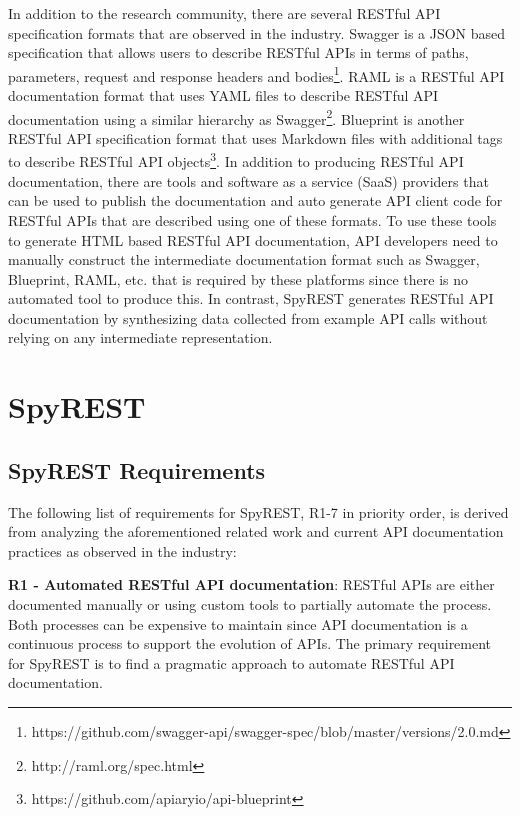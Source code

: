 \documentclass[conference]{IEEEtran}
\begin{document}
In addition to the research community, there are several RESTful API specification formats that are observed in the industry. Swagger is a JSON based specification that allows users to describe RESTful APIs in terms of paths, parameters, request and response headers and bodies\footnote{https://github.com/swagger-api/swagger-spec/blob/master/versions/2.0.md}. RAML is a RESTful API documentation format that uses YAML files to describe RESTful API documentation using a similar hierarchy as Swagger\footnote{http://raml.org/spec.html}. Blueprint is another RESTful API specification format that uses Markdown files with additional tags to describe RESTful API objects\footnote{https://github.com/apiaryio/api-blueprint}. In addition to producing RESTful API documentation, there are tools and software as a service (SaaS) providers that can be used to publish the documentation and auto generate API client code for RESTful APIs that are described using one of these formats. To use these tools to generate HTML based RESTful API documentation, API developers need to manually construct the intermediate documentation format such as Swagger, Blueprint, RAML, etc. that is required by these platforms since there is no automated tool to produce this. In contrast, SpyREST generates RESTful API documentation by synthesizing data collected from example API calls without relying on any intermediate representation.


\section{SpyREST} %
\label{sec:spyrest}

\subsection{SpyREST Requirements} %
\label{sub:spyrest_requirements}

The following list of requirements for SpyREST, R1-7 in priority order, is derived from analyzing the aforementioned related work and current API documentation practices as observed in the industry:

  \textbf{R1 - Automated RESTful API documentation}: RESTful APIs are either documented manually or using custom tools to partially automate the process. Both processes can be expensive to maintain since API documentation is a continuous process to support the evolution of APIs. The primary requirement for SpyREST is to find a pragmatic approach to automate RESTful API documentation.
\end{document}
